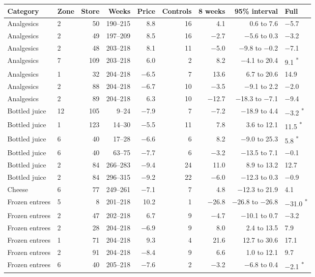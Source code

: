 \begin{tabular}{@{}llrrrrrrl@{}}
\toprule
Category & Zone & Store & Weeks & Price & Controls & 8 weeks & 95\% interval & Full \\
\midrule
Analgesics & 2 & 50 & 190--215 & 8.8 & 16 & 4.1 & 0.6 to 7.6 & −5.7 \\
Analgesics & 2 & 49 & 197--209 & 8.5 & 16 & −2.7 & −5.6 to 0.3 & −3.2 \\
Analgesics & 2 & 48 & 203--218 & 8.1 & 11 & −5.0 & −9.8 to −0.2 & −7.1 \\
Analgesics & 7 & 109 & 203--218 & 6.0 & 2 & 8.2 & −4.1 to 20.4 & 9.1 \textsuperscript{*} \\
Analgesics & 1 & 32 & 204--218 & −6.5 & 7 & 13.6 & 6.7 to 20.6 & 14.9 \\
Analgesics & 2 & 88 & 204--218 & −6.7 & 10 & −3.5 & −9.1 to 2.2 & −2.0 \\
Analgesics & 2 & 89 & 204--218 & 6.3 & 10 & −12.7 & −18.3 to −7.1 & −9.4 \\
Bottled juice & 12 & 105 & 9--24 & −7.9 & 7 & −7.2 & −18.9 to 4.4 & −3.2 \textsuperscript{*} \\
Bottled juice & 1 & 123 & 14--30 & −5.5 & 11 & 7.8 & 3.6 to 12.1 & 11.5 \textsuperscript{*} \\
Bottled juice & 6 & 40 & 17--28 & −6.6 & 6 & 8.2 & −9.0 to 25.3 & 5.8 \textsuperscript{*} \\
Bottled juice & 6 & 40 & 63--75 & −7.7 & 6 & −3.2 & −13.5 to 7.1 & −0.1 \\
Bottled juice & 2 & 84 & 266--283 & −9.4 & 24 & 11.0 & 8.9 to 13.2 & 12.7 \\
Bottled juice & 2 & 84 & 296--315 & −9.2 & 22 & −6.0 & −12.3 to 0.3 & −0.9 \\
Cheese & 6 & 77 & 249--261 & −7.1 & 7 & 4.8 & −12.3 to 21.9 & 4.1 \\
Frozen entrees & 5 & 8 & 201--218 & 10.2 & 1 & −26.8 & −26.8 to −26.8 & −31.0 \textsuperscript{*} \\
Frozen entrees & 2 & 47 & 202--218 & 6.7 & 9 & −4.7 & −10.1 to 0.7 & −3.2 \\
Frozen entrees & 2 & 28 & 204--218 & −6.9 & 9 & 8.0 & 2.4 to 13.5 & 7.9 \\
Frozen entrees & 1 & 71 & 204--218 & 9.3 & 4 & 21.6 & 12.7 to 30.6 & 17.1 \\
Frozen entrees & 2 & 91 & 204--218 & −8.4 & 9 & 6.6 & 1.0 to 12.1 & 9.7 \\
Frozen entrees & 6 & 40 & 205--218 & −7.6 & 2 & −3.2 & −6.8 to 0.4 & −2.1 \textsuperscript{*} \\

\end{tabular}

